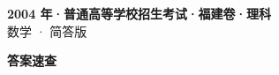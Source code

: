 \documentclass[zihao=-4, a4paper]{ctexart}
\begin{document}
\begin{center}
  {\Large\bfseries 2004 年·普通高等学校招生考试·福建卷·理科}\\[4pt]
  {\large 数学 · 简答版}
\end{center}
\medskip
{}

\clearpage
{}
\begin{center}{\Large\bfseries 答案速查}\end{center}
\medskip

\end{document}
